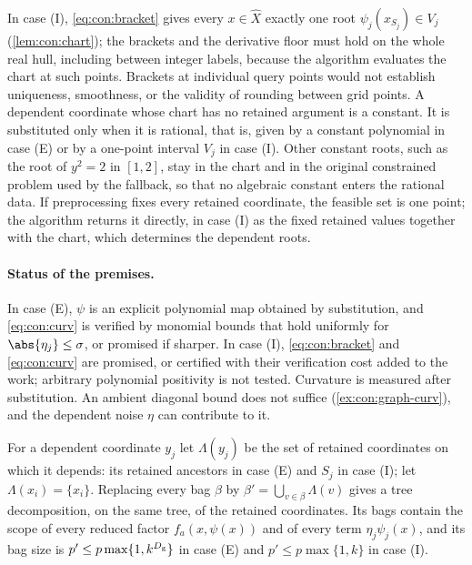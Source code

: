 In case (I), \eqref{eq:con:bracket} gives every $x\in\widehat X$ exactly one
root $\psi_j(x_{S_j})\in V_j$ (\cref{lem:con:chart}); the brackets and the
derivative floor must hold on the whole real hull, including between
integer labels, because the algorithm evaluates the chart at such points.
Brackets at individual query points would not establish uniqueness,
smoothness, or the validity of rounding between grid points. A dependent
coordinate whose chart has no retained argument is a constant. It is
substituted only when it is rational, that is, given by a constant
polynomial in case (E) or by a one-point interval $V_j$ in case (I). Other
constant roots, such as the root of $y^2=2$ in $[1,2]$, stay in the chart
and in the original constrained problem used by the fallback, so that no
algebraic constant enters the rational data. If preprocessing fixes every
retained coordinate, the feasible set is one point; the algorithm returns
it directly, in case (I) as the fixed retained values together with the
chart, which determines the dependent roots.

\paragraph{Status of the premises.} In case (E), $\psi$ is an explicit
polynomial map obtained by substitution, and \eqref{eq:con:curv} is
verified by monomial bounds that hold uniformly for $\abs{\eta_j}\le\sigma$,
or promised if sharper. In case (I), \eqref{eq:con:bracket} and
\eqref{eq:con:curv} are promised, or certified with their verification cost
added to the work; arbitrary polynomial positivity is not tested.
Curvature is measured after substitution. An ambient diagonal bound does
not suffice (\cref{ex:con:graph-curv}), and the dependent noise $\eta$ can
contribute to it.

\begin{lemma}\label{lem:con:expand}
For a dependent coordinate $y_j$ let $\Lambda(y_j)$ be the set of retained
coordinates on which it depends: its retained ancestors in case (E) and
$S_j$ in case (I); let $\Lambda(x_i)=\{x_i\}$. Replacing every bag $\beta$ by
$\beta'=\bigcup_{v\in\beta}\Lambda(v)$ gives a tree decomposition, on the same
tree, of the retained coordinates. Its bags contain the scope of every
reduced factor $f_a(x,\psi(x))$ and of every term $\eta_j\psi_j(x)$, and its
bag size is $p'\le p\max\{1,k^{D_{\rm g}}\}$ in case (E) and
$p'\le p\max\{1,k\}$ in case (I).
\end{lemma}

